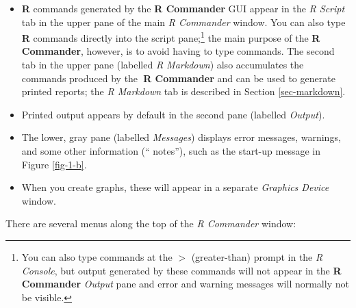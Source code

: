 \documentclass{article}%
\begin{document}
\begin{itemize}
\item \textbf{R} commands generated by the \textbf{R Commander} GUI appear in
the \emph{R Script} tab in the upper pane of the main \emph{R Commander}
window. You can also type \textbf{R} commands directly into the script
pane;\footnote{You can also type commands at the \texttt{$>$} (greater-than) prompt
in the \emph{R Console}, but output generated by these
commands will not appear in the \textbf{R Commander} \emph{Output} pane and
error and warning messages will normally not be visible.} the main purpose of
the \textbf{R Commander}, however, is to avoid having to type commands. The
second tab in the upper pane (labelled \emph{R Markdown}) also accumulates the
commands produced by the\textbf{\ R Commander} and can be used to generate
printed reports; the \emph{R Markdown} tab is described in Section
\ref{sec-markdown}.

\item Printed output appears by default in the second pane (labelled
\emph{Output}).

\item The lower, gray pane (labelled \emph{Messages}) displays error messages,
warnings, and some other information (\textquotedblleft
notes\textquotedblright), such as the start-up message in Figure \ref{fig-1-b}.

\item When you create graphs, these will appear in a separate \emph{Graphics
Device} window.
\end{itemize}

There are several menus along the top of the \emph{R Commander} window:
\end{document}
